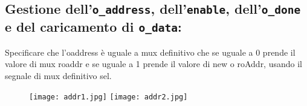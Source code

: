 \documentclass[12pt, table, xcdraw]{article}
\begin{document}
\begin{changemargin}{-3cm}{-1cm}
\begin{tikzpicture}[->,>=stealth',shorten >=1pt,auto,node distance=3cm,
        scale = 1,transform shape]
\end{tikzpicture}
\end{changemargin}


\subsection{Gestione dell'\texttt{o\_address}, dell'\texttt{enable}, dell'\texttt{o\_done} e del caricamento di \texttt{o\_data}:}

Specificare che l'oaddress è uguale a mux definitivo che se uguale a 0 prende il valore di mux roaddr e se uguale a 1 prende il valore di new o roAddr, usando il segnale di mux definitivo sel.

\begin{figure}[h!]
  \texttt{[image: addr1.jpg]}
   \texttt{[image: addr2.jpg]}

\end{figure}
\FloatBarrier
\newpage
\end{document}
